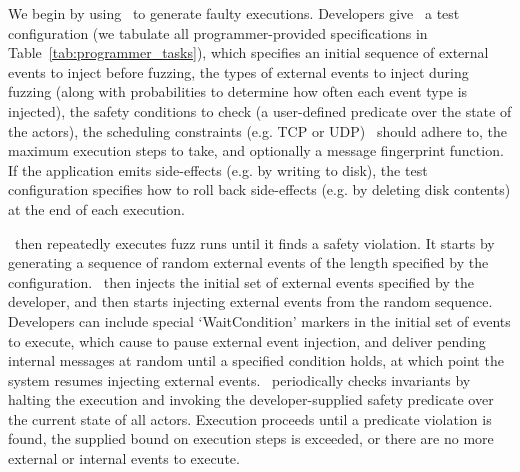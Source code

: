  We begin by using \sys~to generate
faulty executions. Developers give \sys~a test configuration (we
tabulate all programmer-provided specifications in
Table~\ref{tab:programmer_tasks}), which
specifies an initial sequence of external events to inject before fuzzing, the types
of external events to inject during fuzzing (along with probabilities to
determine how often each event type is injected), the safety conditions to
check (a user-defined predicate over the state of the actors), the scheduling constraints (e.g. TCP or UDP) \sys~should
adhere to, the maximum execution steps to take, and
optionally a message fingerprint function. If the
application emits side-effects (e.g. by writing to disk), the test configuration specifies how
to roll back side-effects (e.g. by deleting disk contents) at the end of each execution.

\sys~then repeatedly executes fuzz runs until it finds a safety violation. It starts by
generating a sequence of random external events of the length specified by the configuration.
\sys~then injects the initial set of external events specified by the
developer, and then starts
injecting external events from the random sequence. Developers can include
special `WaitCondition' markers in the
initial set of events to execute, which cause \sys to pause
external event injection, and deliver pending internal
messages at random until a specified condition holds, at which point the
system resumes injecting external events. \sys~periodically checks invariants
by halting the execution and invoking the developer-supplied safety predicate over the current state
of all actors. Execution proceeds until a predicate violation is found, the supplied bound on execution steps
is exceeded, or there are no more external or internal events to execute.


